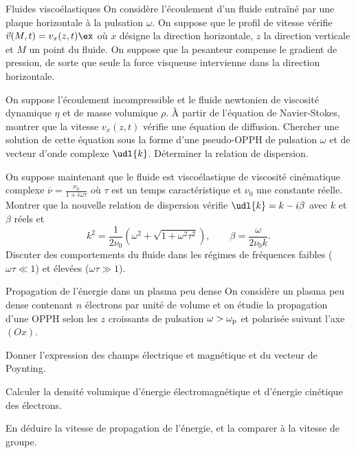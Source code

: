 \begin{exo}[PC][1][colle]{Fluides viscoélastiques}
  On considère l'écoulement d'un fluide entraîné par une plaque horizontale à la pulsation $\omega$. On suppose que le profil de vitesse vérifie $\Vec{v}(M,t) = v_x(z,t) \ex$ où $x$ désigne la direction horizontale, $z$ la direction verticale et $M$ un point du fluide. On suppose que la pesanteur compense le gradient de pression, de sorte que seule la force visqueuse intervienne dans la direction horizontale.
  \begin{quest}
    \item	On suppose l'écoulement incompressible et le fluide newtonien de viscosité dynamique $\eta$ et de masse volumique $\rho$. À partir de l'équation de Navier-Stokes, montrer que la vitesse $v_x(z,t)$ vérifie une équation de diffusion. Chercher une solution de cette équation sous la forme d'une pseudo-OPPH de pulsation $\omega$ et de vecteur d'onde complexe $\udl{k}$. Déterminer la relation de dispersion.
    \item On suppose maintenant que le fluide est viscoélastique de viscosité cinématique complexe $\overline{\nu} = \frac{\nu_0}{1+i\omega \tau}$ où $\tau$ est un temps caractéristique et $\nu_0$ une constante réelle. Montrer que la nouvelle relation de dispersion vérifie $\udl{k} = k-i\beta$ avec $k$ et $\beta$ réels et
    $$
    k^2 = \frac{1}{2\nu_0}\left( \omega^2 + \sqrt{1+\omega^2\tau^2} \right), \qquad \beta = \frac{\omega}{2\nu_0 k}.
    $$
    Discuter des comportements du fluide dans les régimes de fréquences faibles ($\omega\tau \ll1$) et élevées ($\omega\tau \gg 1$).
  \end{quest}
\end{exo}

\begin{exo}[PC]{Propagation de l'énergie dans un plasma peu dense}
On considère un plasma peu dense contenant $n$ électrons par unité de volume et on étudie la propagation d'une OPPH selon les $z$ croissants de pulsation $\omega>\omega_{\rm{p}}$ et polarisée suivant l'axe $(Ox)$.
\begin{quest}
\item Donner l'expression des champs électrique et magnétique et du vecteur de Poynting.
\item Calculer la densité volumique d'énergie électromagnétique et d'énergie cinétique des électrons.
\item En déduire la vitesse de propagation de l'énergie, et la comparer à la vitesse de groupe.
\end{quest}
\end{exo}

